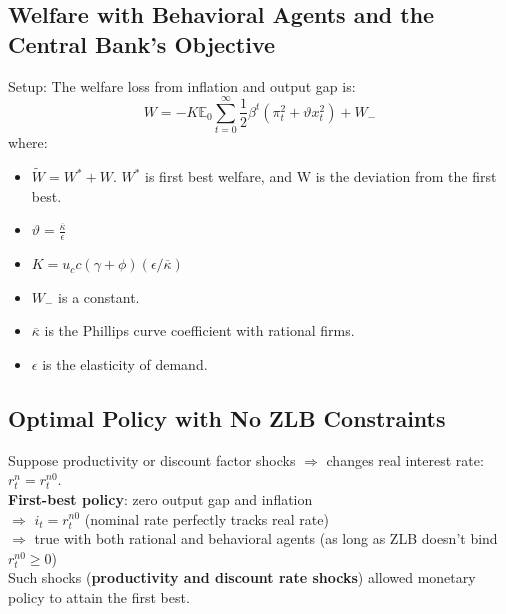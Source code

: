 \documentclass{beamer}
\begin{document}
\begin{frame}
    \tableofcontents[currentsection, hideothersubsections, sections=\value{section}]
\end{frame}

\subsection{Welfare with Behavioral Agents and the Central Bank’s Objective}

\begin{frame}{\subsecname}
    Setup: The welfare loss from inflation and output gap is:
    \begin{equation}\tag{39}
        W=-K\mathbb{E}_{0}\sum_{t=0}^{\infty}\frac{1}{2}\beta^{t}\left(\pi_{t}^{2}+\vartheta x_{t}^{2}\right)+W_{-}
    \end{equation}
    where:
    \begin{itemize}
        \item $\widetilde{W}=W^{*}+W$. $W^{*}$ is first best welfare, and W is the deviation from the first best.
        \item $\vartheta=\frac{\overline{\kappa}}{\epsilon}$
        \item $K=u_{c}c\left(\gamma+\phi\right)\left(\epsilon/\overline{\kappa}\right)$
        \item $W_{-}$ is a constant.
        \item $\overline{\kappa}$ is the Phillips curve coefficient with rational firms.
        \item $\epsilon$ is the elasticity of demand.
    \end{itemize}
\end{frame}

\subsection{Optimal Policy with No ZLB Constraints}

\begin{frame}{\subsecname}
    Suppose productivity or discount factor shocks $\Rightarrow$ changes real interest rate: $r_{t}^{n} = r_{t}^{n0}$.\\
    \hfill \linebreak
    \textbf{First-best policy}: zero output gap and inflation \\$\Rightarrow$ $i_{t}=r_{t}^{n0}$ (nominal rate perfectly tracks real rate) \\$\Rightarrow$ true with both rational and behavioral agents (as long as ZLB doesn’t bind $r_{t}^{n0}\geq 0$)\\
    \hfill \linebreak
    Such shocks (\textbf{productivity and discount rate shocks}) allowed monetary
    policy to attain the first best.
\end{frame}
\end{document}
